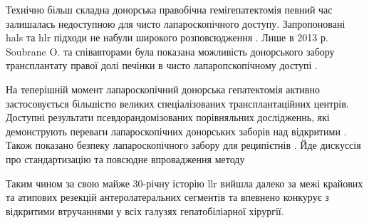 Технічно більш складна донорська правобічна гемігепатектомія певний час залишалась недоступною для чисто лапароскопічного доступу. Запропоновані \acrshort{hals} та \acrshort{hlr} підходи не набули широкого розповсюдження \cite{Koffron2006, Thenappan2011, Lin2013}. Лише в 2013 р. Soubrane O. та співавторами була показана можливість донорського забору трансплантату правої долі печінки в чисто лапаропскопічному доступі \cite{Soubrane2013}. 

На теперішній момент лапароскопічний донорська гепатектомія активно застосовується більшістю великих спеціалізованих трансплантаційних центрів. Доступні результати псевдорандомізованих порівняльних дослідженнь, які демонструють переваги лапароскопічних донорських заборів над відкритими \cite{Broering2018, Park2019a}. Також показано безпеку лапароскопічного забору для реципієтнів \cite{Kwon2018a}. Йде дискуссія про стандартизацію та повсюдне впровадження методу \cite{Au2018, Samstein2018}

Таким чином за свою майже 30-річну історію \acrshort{llr} вийшла далеко за межі крайових та атипових резекцій антеролатеральних сегментів та впевнено конкурує з відкритими втручаннями у всіх галузях гепатобіліарної хірургії. 